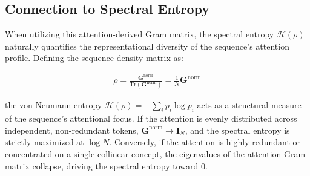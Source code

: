 \documentclass{article}
\begin{document}
\subsection{Connection to Spectral Entropy}

When utilizing this attention-derived Gram matrix, the spectral entropy $\mathcal{H}(\rho)$ naturally quantifies the representational diversity of the sequence's attention profile. Defining the sequence density matrix as:

\begin{align}
    \rho = \frac{\mathbf{G}^{\text{norm}}}{\text{Tr}(\mathbf{G}^{\text{norm}})} = \frac{1}{N} \mathbf{G}^{\text{norm}}
\end{align}

the von Neumann entropy $\mathcal{H}(\rho) = -\sum_i p_i \log p_i$ acts as a structural measure of the sequence's attentional focus. If the attention is evenly distributed across independent, non-redundant tokens, $\mathbf{G}^{\text{norm}} \to \mathbf{I}_N$, and the spectral entropy is strictly maximized at $\log N$. Conversely, if the attention is highly redundant or concentrated on a single collinear concept, the eigenvalues of the attention Gram matrix collapse, driving the spectral entropy toward $0$.
\end{document}

